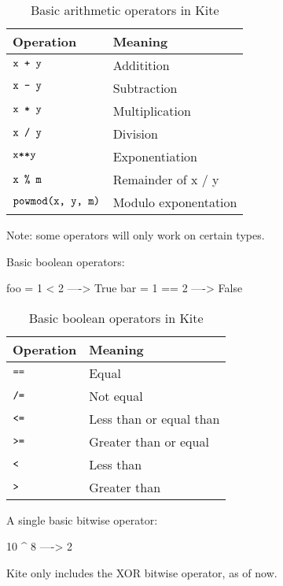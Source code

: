 \begin{table}[H]
  \centering
  \begin{tabular}{|l|l|}
    \hline
    Operation      & Meaning              \\ \hline
    $\texttt{x + y}$        & Additition           \\ \hline
    $\texttt{x - y}$        & Subtraction          \\ \hline
    $\texttt{x * y}$        & Multiplication       \\ \hline
    $\texttt{x / y}$        & Division             \\ \hline
    $\texttt{x**y}$         & Exponentiation       \\ \hline
    $\texttt{x \% m}$       & Remainder of x / y   \\ \hline
    $\texttt{powmod(x, y, m)}$ & Modulo exponentation \\ \hline
  \end{tabular}
  \label{tbl:kite-design-arith-op}
  \caption{Basic arithmetic operators in Kite}
\end{table}
Note: some operators will only work on certain types.

Basic boolean operators:
\begin{kite}
foo = 1 < 2  ----> True
bar = 1 == 2 ----> False
\end{kite}

\begin{table}[H]
  \centering
  \begin{tabular}{|l|l|}
    \hline
    Operation     & Meaning                 \\ \hline
    $\texttt{==}$          & Equal                   \\ \hline
    $\texttt{/=}$ & Not equal               \\ \hline
    $\texttt{<=}$          & Less than or equal than \\ \hline
    $\texttt{>=}$          & Greater than or equal   \\ \hline
    $\texttt{<}$           & Less than               \\ \hline
    $\texttt{>}$           & Greater than            \\ \hline
  \end{tabular}
  \label{tbl:kite-disign-bool-op}
  \caption{Basic boolean operators in Kite}
\end{table}

A single basic bitwise operator:
\begin{kite}
10 ^ 8 ----> 2
\end{kite}
Kite only includes the XOR bitwise operator, as of now.


